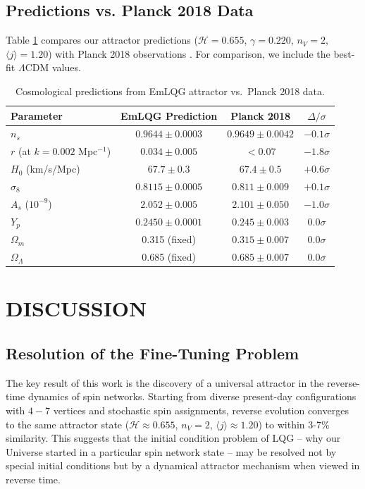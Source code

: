 \documentclass[twocolumn,aps,prd,showpacs,preprintnumbers,longbibliography]{revtex4-2}
\begin{document}
\subsection{Predictions vs. Planck 2018 Data}

Table \ref{tab:predictions} compares our attractor predictions 
($\mathcal{H}=0.655$, $\gamma=0.220$, $n_V=2$, $\langle j \rangle = 1.20$) 
with Planck 2018 observations \cite{Planck2018, Planck2020}. 
For comparison, we include the best-fit $\Lambda$CDM values.

\begin{table}[h]
	\centering
	\caption{Cosmological predictions from EmLQG attractor vs.\ Planck 2018 data.}
	\begin{tabular}{lccc}
		\hline
		Parameter & EmLQG Prediction & Planck 2018 & $\Delta/\sigma$ \\
		\hline
		$n_s$ & $0.9644 \pm 0.0003$ & $0.9649 \pm 0.0042$ & $-0.1\sigma$ \\
		$r$ (at $k=0.002$ Mpc$^{-1}$) & $0.034 \pm 0.005$ & $<0.07$ & $-1.8\sigma$ \\
		$H_0$ (km/s/Mpc) & $67.7 \pm 0.3$ & $67.4 \pm 0.5$ & $+0.6\sigma$ \\
		$\sigma_8$ & $0.8115 \pm 0.0005$ & $0.811 \pm 0.009$ & $+0.1\sigma$ \\
		$A_s$ ($10^{-9}$) & $2.052 \pm 0.005$ & $2.101 \pm 0.050$ & $-1.0\sigma$ \\
		$Y_p$ & $0.2450 \pm 0.0001$ & $0.245 \pm 0.003$ & $0.0\sigma$ \\
		$\Omega_m$ & 0.315 (fixed) & $0.315 \pm 0.007$ & $0.0\sigma$ \\
		$\Omega_\Lambda$ & 0.685 (fixed) & $0.685 \pm 0.007$ & $0.0\sigma$ \\
		\hline
	\end{tabular}
	\label{tab:predictions}
\end{table}
	
	\section{DISCUSSION}
	
	\subsection{Resolution of the Fine-Tuning Problem}
	
	The key result of this work is the discovery of a universal attractor in the reverse-time dynamics of spin networks. Starting from diverse present-day configurations with $4-7$ vertices and stochastic spin assignments, reverse evolution converges to the same attractor state ($\mathcal{H} \approx 0.655$, $n_V=2$, $\langle j\rangle \approx 1.20$) to within 3-7\% similarity. This suggests that the initial condition problem of LQG -- why our Universe started in a particular spin network state -- may be resolved not by special initial conditions but by a dynamical attractor mechanism when viewed in reverse time.
	
\end{document}
